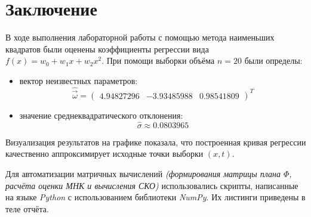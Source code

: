 \section{Заключение}

В ходе выполнения лабораторной работы с помощью метода наименьших квадратов были оценены коэффициенты регрессии вида $f(x) = w_0 + w_1 x + w_2 x^2$. При помощи выборки объёма \( n=20 \) были определы:

\begin{itemize}
    \item вектор неизвестных параметров:
    \[
        \hat{\vec{\omega}} = \begin{pmatrix} 4.94827296 & -3.93485988 & 0.98541809 \end{pmatrix}^{T}
    \]
    \item значение среднеквадратического отклонения:
    \[
        \hat{\sigma} \approx 0.0803965
    \]
\end{itemize}

Визуализация результатов на графике показала, что построенная кривая регрессии качественно аппроксимирует исходные точки выборки $(x, t)$.

Для автоматизации матричных вычислений \textit{(формирования матрицы плана $\Phi$, расчёта оценки МНК и вычисления СКО)} использовались скрипты, написанные на языке \textit{Python} с использованием библиотеки \textit{NumPy}. Их листинги приведены в теле отчёта.